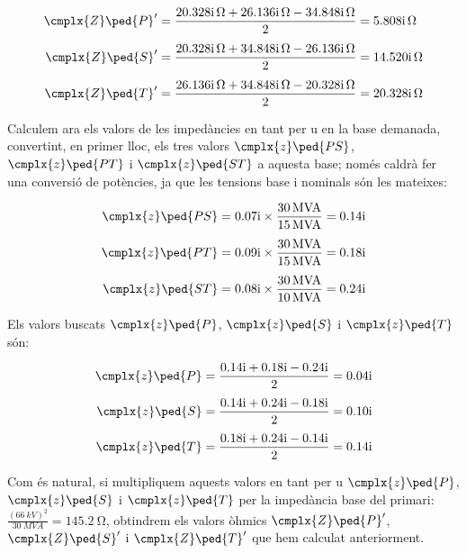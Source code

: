 \begin{exemple}[\ImpCircEqTrafoTresDeb{}]
    \begin{align*}
        \cmplx{Z}\ped{P}' &=  \frac{\complexqty{j 20,328}{\ohm} + \complexqty{j 26,136}{\ohm} - \complexqty{j 34,848}{\ohm}}{2} = \complexqty{j 5,808}{\ohm} \\[1ex]
        \cmplx{Z}\ped{S}' &=  \frac{\complexqty{j 20,328}{\ohm} + \complexqty{j 34,848}{\ohm} - \complexqty{j 26,136}{\ohm}}{2} = \complexqty{j 14,520}{\ohm} \\[1ex]
        \cmplx{Z}\ped{T}' &=  \frac{\complexqty{j 26,136}{\ohm} + \complexqty{j 34,848}{\ohm} - \complexqty{j 20,328}{\ohm}}{2} = \complexqty{j 20,328}{\ohm}
    \end{align*}

    Calculem ara els valors de les impedàncies en tant per u en la base demanada, convertint, en primer lloc, els tres valors $\cmplx{z}\ped{PS}$, $\cmplx{z}\ped{PT}$ i $\cmplx{z}\ped{ST}$ a aquesta base; només caldrà fer una conversió de potències, ja que les tensions base i nominals són les mateixes:

    \begin{align*}
        \cmplx{z}\ped{PS} &=  \complexnum{j 0,07} \times \frac{\qty{30}{MVA}}{\qty{15}{MVA}} = \complexnum{j 0,14}\\[1ex]
        \cmplx{z}\ped{PT} &=  \complexnum{j 0,09} \times \frac{\qty{30}{MVA}}{\qty{15}{MVA}} = \complexnum{j 0,18}\\[1ex]
        \cmplx{z}\ped{ST} &=  \complexnum{j 0,08} \times \frac{\qty{30}{MVA}}{\qty{10}{MVA}} = \complexnum{j 0,24}
    \end{align*}

    Els valors buscats $\cmplx{z}\ped{P}$, $\cmplx{z}\ped{S}$ i $\cmplx{z}\ped{T}$ són:

    \begin{align*}
        \cmplx{z}\ped{P} &=  \frac{\complexnum{j 0,14} + \complexnum{j 0,18} - \complexnum{j 0,24}}{2} = \complexnum{j 0,04} \\[1ex]
        \cmplx{z}\ped{S} &=  \frac{\complexnum{j 0,14} + \complexnum{j 0,24} - \complexnum{j 0,18}}{2} = \complexnum{j 0,10} \\[1ex]
        \cmplx{z}\ped{T} &=  \frac{\complexnum{j 0,18} + \complexnum{j 0,24} - \complexnum{j 0,14}}{2} = \complexnum{j 0,14}
    \end{align*}

     Com és natural, si multipliquem aquests valors en tant per u  $\cmplx{z}\ped{P}$, $\cmplx{z}\ped{S}$ i $\cmplx{z}\ped{T}$ per la impedància base del primari: $\frac{(\qty{66}{kV})^2}{\qty{30}{MVA}}=\qty{145,2}{\ohm}$, obtindrem els valors òhmics $\cmplx{Z}\ped{P}'$,     $\cmplx{Z}\ped{S}'$ i $\cmplx{Z}\ped{T}'$ que hem calculat anteriorment.

\end{exemple}


